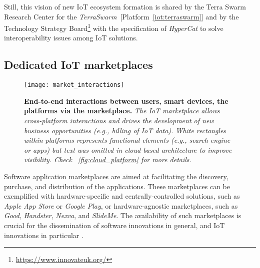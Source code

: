 \documentclass[preprint,10pt,5p]{elsarticle}
\newcommand{\citeiot}[1]{[Platform~\ref{#1}]}
\begin{document}
Still, this vision of new IoT ecosystem formation is shared by the
Terra Swarm Research Center for the
\emph{TerraSwarm}~\citeiot{iot:terraswarm} and by the Technology Strategy
Board\footnote{\url{https://www.innovateuk.org/}} 
with the specification of \emph{HyperCat} to solve interoperability issues 
among IoT solutions.


\subsection{Dedicated IoT marketplaces}\label{sec:marketplace}
\label{sec:gap_marketplace}

\begin{figure}[t]
 \centering
 \texttt{[image: market\_interactions]}
 \caption{
 	\textbf{End-to-end interactions between users, smart devices, the platforms via the marketplace.}
 	\textsl{The IoT marketplace allows cross-platform interactions and drives the development of new 
    business opportunities (e.g., billing of IoT data). White rectangles within platforms represents 
    functional elements (e.g., search engine or apps) but text was omitted in cloud-based architecture to improve visibility. 
    Check \figurename~\ref{fig:cloud_platform} for more details.}
 }
 \label{fig:market_interactions}
\end{figure}

Software application marketplaces are aimed at facilitating the discovery,
purchase, and distribution of the applications. 
These marketplaces can be exemplified with hardware-specific and
centrally-controlled solutions, such as \emph{Apple App Store} or \emph{Google
Play}, or hardware-agnostic marketplaces, such as \emph{Good}, \emph{Handster},
\emph{Nexva}, and \emph{SlideMe}. 
The availability of such marketplaces is crucial for the dissemination of
software innovations in general, and IoT innovations in particular
\cite{Kortuem2010}.  
\end{document}

